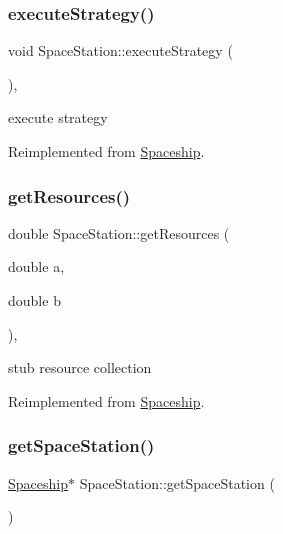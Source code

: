 \subsubsection{\texorpdfstring{execute\+Strategy()}{executeStrategy()}}
{\footnotesize\ttfamily void Space\+Station\+::execute\+Strategy (\begin{DoxyParamCaption}{ }\end{DoxyParamCaption})\hspace{0.3cm}{\ttfamily [inline]}, {\ttfamily [virtual]}}

execute strategy 

Reimplemented from \hyperlink{classSpaceship}{Spaceship}.

\mbox{\label{classSpaceStation_ae701844b2b5013cd51cc5ead813e7e51}} 
\subsubsection{\texorpdfstring{get\+Resources()}{getResources()}}
{\footnotesize\ttfamily double Space\+Station\+::get\+Resources (\begin{DoxyParamCaption}\item[{double}]{a,  }\item[{double}]{b }\end{DoxyParamCaption})\hspace{0.3cm}{\ttfamily [inline]}, {\ttfamily [virtual]}}

stub resource collection 

Reimplemented from \hyperlink{classSpaceship_ad2027533de1d789db5e3efa22055f2d0}{Spaceship}.

\mbox{\label{classSpaceStation_acffc1d332b904f06b55288819e69f3c8}} 
\subsubsection{\texorpdfstring{get\+Space\+Station()}{getSpaceStation()}}
{\footnotesize\ttfamily \hyperlink{classSpaceship}{Spaceship}$\ast$ Space\+Station\+::get\+Space\+Station (\begin{DoxyParamCaption}{ }\end{DoxyParamCaption})}

